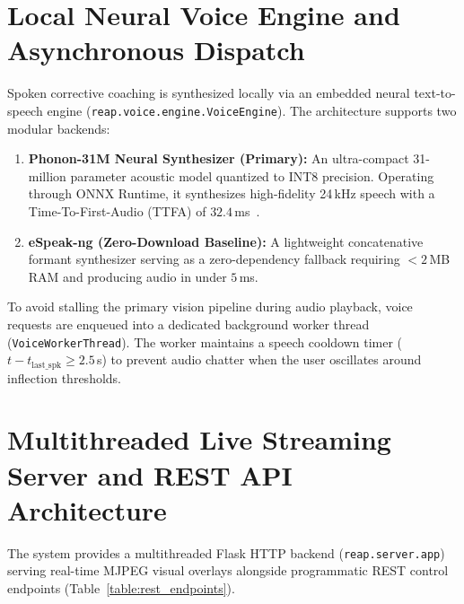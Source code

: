 \documentclass[12pt]{report}
\begin{document}
\section{Local Neural Voice Engine and Asynchronous Dispatch}
Spoken corrective coaching is synthesized locally via an embedded neural text-to-speech engine (\texttt{reap.voice.engine.VoiceEngine}). The architecture supports two modular backends:
\begin{enumerate}
    \item \textbf{Phonon-31M Neural Synthesizer (Primary):} An ultra-compact 31-million parameter acoustic model quantized to INT8 precision. Operating through ONNX Runtime, it synthesizes high-fidelity 24\,kHz speech with a Time-To-First-Audio (TTFA) of $32.4$\,ms~\cite{ren2021fastspeech2, chen2021wavegrad}.
    \item \textbf{eSpeak-ng (Zero-Download Baseline):} A lightweight concatenative formant synthesizer serving as a zero-dependency fallback requiring $<2$\,MB RAM and producing audio in under $5$\,ms.
\end{enumerate}

To avoid stalling the primary vision pipeline during audio playback, voice requests are enqueued into a dedicated background worker thread (\texttt{VoiceWorkerThread}). The worker maintains a speech cooldown timer ($t - t_{\text{last\_spk}} \ge 2.5$\,s) to prevent audio chatter when the user oscillates around inflection thresholds.

\section{Multithreaded Live Streaming Server and REST API Architecture}
The system provides a multithreaded Flask HTTP backend (\texttt{reap.server.app}) serving real-time MJPEG visual overlays alongside programmatic REST control endpoints (Table~\ref{table:rest_endpoints}).
\end{document}

